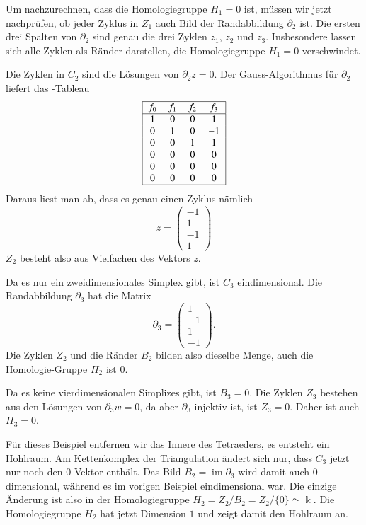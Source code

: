 \begin{beispiel}
Um nachzurechnen, dass die Homologiegruppe $H_1=0$ ist, müssen wir jetzt 
nachprüfen, ob jeder Zyklus in $Z_1$ auch Bild der Randabbildung $\partial_2$
ist.
Die ersten drei Spalten von $\partial_2$ sind genau die drei Zyklen
$z_1$, $z_2$ und $z_3$.
Insbesondere lassen sich alle Zyklen als Ränder darstellen, die
Homologiegruppe $H_1=0$ verschwindet.

Die Zyklen in $C_2$ sind die Lösungen von $\partial_2z=0$.
Der Gauss-Algorithmus für $\partial_2$ liefert das -Tableau
\[
\begin{tabular}{|>{$}c<{$}>{$}c<{$}>{$}c<{$}>{$}c<{$}|}
\hline
f_0&f_1&f_2&f_3\\
\hline
1&0&0& 1\\
0&1&0&-1\\
0&0&1& 1\\
0&0&0& 0\\
0&0&0& 0\\
0&0&0& 0\\
\hline
\end{tabular}
\]
Daraus liest man ab, dass es genau einen Zyklus nämlich
\[
z
=
\begin{pmatrix}
-1\\1\\-1\\1
\end{pmatrix}
\]
$Z_2$ besteht also aus Vielfachen des Vektors $z$.

Da es nur ein zweidimensionales Simplex gibt, ist $C_3$ eindimensional.
Die Randabbildung $\partial_3$ hat die Matrix
\[
\partial_3
=
\begin{pmatrix}
1\\
-1\\
1\\
-1
\end{pmatrix}.
\]
Die Zyklen $Z_2$ und die Ränder $B_2$ bilden also dieselbe Menge, auch
die Homologie-Gruppe $H_2$ ist $0$.

Da es keine vierdimensionalen Simplizes gibt, ist $B_3=0$.
Die Zyklen $Z_3$ bestehen aus den Lösungen von $\partial_3w=0$, da
aber $\partial_3$ injektiv ist, ist $Z_3=0$.
Daher ist auch $H_3=0$.
\end{beispiel}

\begin{beispiel}
Für dieses Beispiel entfernen wir das Innere des Tetraeders, es entsteht
ein Hohlraum.
Am Kettenkomplex der Triangulation ändert sich nur, dass $C_3$ jetzt 
nur noch den $0$-Vektor enthält.
Das Bild $B_2=\operatorname{im}\partial_3$ wird damit auch $0$-dimensional,
während es im vorigen Beispiel eindimensional war.
Die einzige Änderung ist also in der Homologiegruppe 
$H_2 = Z_2/B_2 = Z_2 / \{0\} \simeq \Bbbk$.
Die Homologiegruppe $H_2$ hat jetzt Dimension $1$ und zeigt damit den
Hohlraum an.
\end{beispiel}

